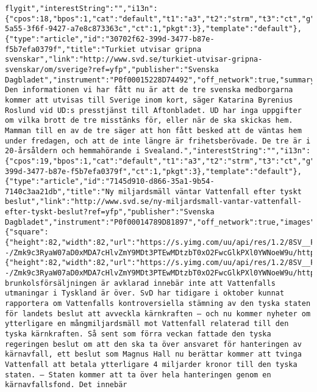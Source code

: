\begin{verbatim}
flygit","interestString":"","i13n":{"cpos":18,"bpos":1,"cat":"default","t1":"a3","t2":"strm","t3":"ct","g":"21af7727-5a55-3f6f-9427-a7e8c873363c","ct":1,"pkgt":3},"template":"default"},{"type":"article","id":"30702f62-399d-3477-b87e-f5b7efa0379f","title":"Turkiet utvisar gripna svenskar","link":"http://www.svd.se/turkiet-utvisar-gripna-svenskar/om/sverige?ref=yfp","publisher":"Svenska Dagbladet","instrument":"P0f00015228D74492","off_network":true,"summary":"– Den informationen vi har fått nu är att de tre svenska medborgarna kommer att utvisas till Sverige inom kort, säger Katarina Byrenius Roslund vid UD:s presstjänst till Aftonbladet. UD har inga uppgifter om vilka brott de tre misstänks för, eller när de ska skickas hem. Mamman till en av de tre säger att hon fått besked att de väntas hem under fredagen, och att de inte längre är frihetsberövade. De tre är i 20-årsåldern och hemmahörande i Svealand.","interestString":"","i13n":{"cpos":19,"bpos":1,"cat":"default","t1":"a3","t2":"strm","t3":"ct","g":"30702f62-399d-3477-b87e-f5b7efa0379f","ct":1,"pkgt":3},"template":"default"},{"type":"article","id":"7145d910-d866-35a1-9b54-7140c3aa21db","title":"Ny miljardsmäll väntar Vattenfall efter tyskt beslut","link":"http://www.svd.se/ny-miljardsmall-vantar-vattenfall-efter-tyskt-beslut?ref=yfp","publisher":"Svenska Dagbladet","instrument":"P0f00014789D81897","off_network":true,"images":{"square":{"height":82,"width":82,"url":"https://s.yimg.com/uu/api/res/1.2/8SV__Fz3eprYiW2YnAxHiw--/Zmk9c3RyaW07aD0xMDA7cHlvZmY9MDt3PTEwMDtzbT0xO2FwcGlkPXl0YWNoeW9u/http://slingstone.zenfs.com/offnetwork/8fb295450d61deffe1d22a21ec70b08b","defer":1}},"image":{"height":82,"width":82,"url":"https://s.yimg.com/uu/api/res/1.2/8SV__Fz3eprYiW2YnAxHiw--/Zmk9c3RyaW07aD0xMDA7cHlvZmY9MDt3PTEwMDtzbT0xO2FwcGlkPXl0YWNoeW9u/http://slingstone.zenfs.com/offnetwork/8fb295450d61deffe1d22a21ec70b08b","defer":1},"summary":"Att brunkolsförsäljningen är avklarad innebär inte att Vattenfalls utmaningar i Tyskland är över. SvD har tidigare i oktober kunnat rapportera om Vattenfalls kontroversiella stämning av den tyska staten för landets beslut att avveckla kärnkraften – och nu kommer nyheter om ytterligare en mångmiljardsmäll mot Vattenfall relaterad till den tyska kärnkraften. Så sent som förra veckan fattade den tyska regeringen beslut om att den ska ta över ansvaret för hanteringen av kärnavfall, ett beslut som Magnus Hall nu berättar kommer att tvinga Vattenfall att betala ytterligare 4 miljarder kronor till den tyska staten. – Staten kommer att ta över hela hanteringen genom en kärnavfallsfond. Det innebär 
\end{verbatim}
